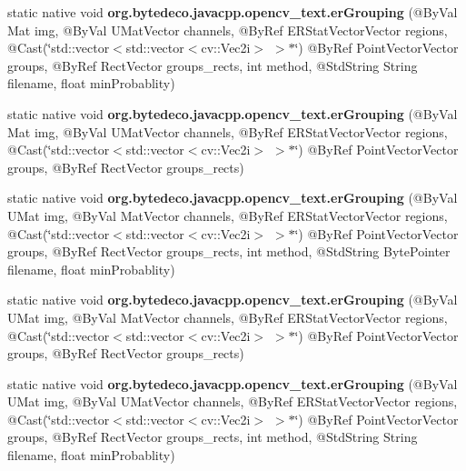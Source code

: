 \begin{DoxyCompactItemize}
\item 
\mbox{\label{group__text__detect_ga612a196636f1f850aa2b0ab6ba3e042f}} 
static native void {\bfseries org.\+bytedeco.\+javacpp.\+opencv\+\_\+text.\+er\+Grouping} (@By\+Val Mat img, @By\+Val U\+Mat\+Vector channels, @By\+Ref E\+R\+Stat\+Vector\+Vector regions, @Cast(\char`\"{}std\+::vector$<$std\+::vector$<$cv\+::\+Vec2i$>$ $>$$\ast$\char`\"{}) @By\+Ref Point\+Vector\+Vector groups, @By\+Ref Rect\+Vector groups\+\_\+rects, int method, @Std\+String String filename, float min\+Probablity)
\item 
\mbox{\label{group__text__detect_ga5a88d259858f8d9addad5d39344c0ed4}} 
static native void {\bfseries org.\+bytedeco.\+javacpp.\+opencv\+\_\+text.\+er\+Grouping} (@By\+Val Mat img, @By\+Val U\+Mat\+Vector channels, @By\+Ref E\+R\+Stat\+Vector\+Vector regions, @Cast(\char`\"{}std\+::vector$<$std\+::vector$<$cv\+::\+Vec2i$>$ $>$$\ast$\char`\"{}) @By\+Ref Point\+Vector\+Vector groups, @By\+Ref Rect\+Vector groups\+\_\+rects)
\item 
\mbox{\label{group__text__detect_ga06e9e2e730381e2b62700dcd5b9157fe}} 
static native void {\bfseries org.\+bytedeco.\+javacpp.\+opencv\+\_\+text.\+er\+Grouping} (@By\+Val U\+Mat img, @By\+Val Mat\+Vector channels, @By\+Ref E\+R\+Stat\+Vector\+Vector regions, @Cast(\char`\"{}std\+::vector$<$std\+::vector$<$cv\+::\+Vec2i$>$ $>$$\ast$\char`\"{}) @By\+Ref Point\+Vector\+Vector groups, @By\+Ref Rect\+Vector groups\+\_\+rects, int method, @Std\+String Byte\+Pointer filename, float min\+Probablity)
\item 
\mbox{\label{group__text__detect_ga373c44d54fdc93c2e50bdde71c156941}} 
static native void {\bfseries org.\+bytedeco.\+javacpp.\+opencv\+\_\+text.\+er\+Grouping} (@By\+Val U\+Mat img, @By\+Val Mat\+Vector channels, @By\+Ref E\+R\+Stat\+Vector\+Vector regions, @Cast(\char`\"{}std\+::vector$<$std\+::vector$<$cv\+::\+Vec2i$>$ $>$$\ast$\char`\"{}) @By\+Ref Point\+Vector\+Vector groups, @By\+Ref Rect\+Vector groups\+\_\+rects)
\item 
\mbox{\label{group__text__detect_ga3fe1fa2a3b9ca5cbcdbedfc4d45b36e1}} 
static native void {\bfseries org.\+bytedeco.\+javacpp.\+opencv\+\_\+text.\+er\+Grouping} (@By\+Val U\+Mat img, @By\+Val U\+Mat\+Vector channels, @By\+Ref E\+R\+Stat\+Vector\+Vector regions, @Cast(\char`\"{}std\+::vector$<$std\+::vector$<$cv\+::\+Vec2i$>$ $>$$\ast$\char`\"{}) @By\+Ref Point\+Vector\+Vector groups, @By\+Ref Rect\+Vector groups\+\_\+rects, int method, @Std\+String String filename, float min\+Probablity)
$$
\end{DoxyCompactItemize}

